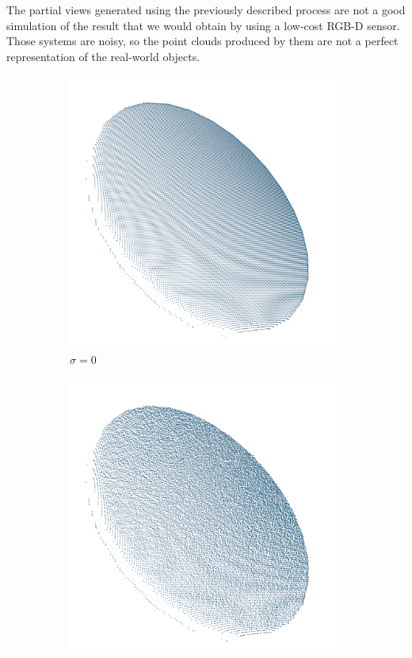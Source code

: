 The partial views generated using the previously described process are not a good simulation of the result that we would obtain by using a low-cost \acs{RGB-D} sensor. Those systems are noisy, so the point clouds produced by them are not a perfect representation of the real-world objects.

\begin{figure}[!bh]
	\centering
	\hfill
	\begin{subfigure}{0.32\textwidth}
		\centering
		\includegraphics[width=\linewidth]{Figures/ObjRecog/stddev_0}
		\caption{$\sigma=0$}
		\label{subfig:objrecog:noise:0}
	\end{subfigure}
	\hfill
	\begin{subfigure}{0.32\textwidth}
		\centering
		\includegraphics[width=\linewidth]{Figures/ObjRecog/stddev_01}

\end{subfigure}
\end{figure}
